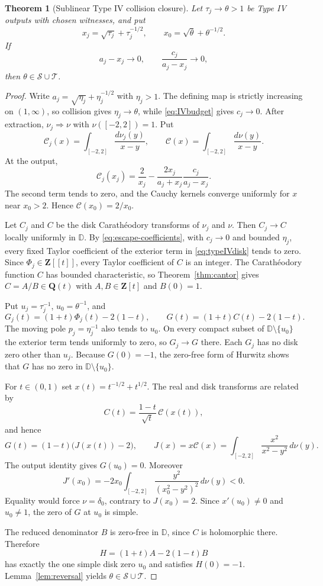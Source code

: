 \documentclass[11pt,reqno]{amsart}
\newtheorem{theorem}{Theorem}[section]
\theoremstyle{definition}
\theoremstyle{remark}
\newcommand{\D}{\mathbb D}
\newcommand{\Q}{\mathbf Q}
\newcommand{\Z}{\mathbf Z}
\newcommand{\calS}{\mathcal S}
\newcommand{\calT}{\mathcal T}
\begin{document}
\begin{theorem}[Sublinear Type IV collision closure]
\label{thm:IVsublinear}
Let $\tau_j\to\theta>1$ be Type IV outputs with chosen witnesses, and put
\[
 x_j=\sqrt{\tau_j}+\tau_j^{-1/2},\qquad
 x_0=\sqrt\theta+\theta^{-1/2}.
\]
If
\begin{equation}\label{eq:IVsublinear}
 a_j-x_j\longrightarrow0,
 \qquad \frac{c_j}{a_j-x_j}\longrightarrow0,
\end{equation}
then $\theta\in\calS\cup\calT$.
\end{theorem}

\begin{proof}
Write $a_j=\sqrt{\eta_j}+\eta_j^{-1/2}$ with $\eta_j>1$.  The defining
map is strictly increasing on $(1,\infty)$, so collision gives
$\eta_j\to\theta$, while \eqref{eq:IVbudget} gives $c_j\to0$.  After
extraction, $\nu_j\Rightarrow\nu$ with $\nu([-2,2])=1$.  Put
\[
 \mathcal C_j(x)=\int_{[-2,2]}\frac{d\nu_j(y)}{x-y},
 \qquad
 \mathcal C(x)=\int_{[-2,2]}\frac{d\nu(y)}{x-y}.
\]
At the output,
\[
 \mathcal C_j(x_j)=\frac2{x_j}
 -\frac{2x_j}{a_j+x_j}\frac{c_j}{a_j-x_j}.
\]
The second term tends to zero, and the Cauchy kernels converge uniformly for
$x$ near $x_0>2$.  Hence $\mathcal C(x_0)=2/x_0$.

Let $C_j$ and $C$ be the disk Carath\'eodory transforms of $\nu_j$ and
$\nu$.  Then $C_j\to C$ locally uniformly in $\D$.  By
\eqref{eq:escape-coefficients}, with $c_j\to0$ and bounded $\eta_j$, every
fixed Taylor coefficient of the exterior term in \eqref{eq:typeIVdisk}
tends to zero.  Since $\Phi_j\in\Z[[t]]$, every Taylor coefficient of $C$
is an integer.  The Carath\'eodory function $C$ has bounded characteristic,
so Theorem~\ref{thm:cantor} gives
$C=A/B\in\Q(t)$ with $A,B\in\Z[t]$ and $B(0)=1$.

Put $u_j=\tau_j^{-1}$, $u_0=\theta^{-1}$, and
\[
 G_j(t)=(1+t)\Phi_j(t)-2(1-t),\qquad
 G(t)=(1+t)C(t)-2(1-t).
\]
The moving pole $p_j=\eta_j^{-1}$ also tends to $u_0$.  On every compact
subset of $\D\setminus\{u_0\}$ the exterior term tends uniformly to zero,
so $G_j\to G$ there.  Each $G_j$ has no disk zero other than $u_j$.
Because $G(0)=-1$, the zero-free form of Hurwitz shows that $G$ has no zero
in $\D\setminus\{u_0\}$.

For $t\in(0,1)$ set $x(t)=t^{-1/2}+t^{1/2}$.  The real and disk transforms
are related by
\[
 C(t)=\frac{1-t}{\sqrt t}\,\mathcal C(x(t)),
\]
and hence
\[
 G(t)=(1-t)\bigl(J(x(t))-2\bigr),\qquad
 J(x)=x\mathcal C(x)
 =\int_{[-2,2]}\frac{x^2}{x^2-y^2}\,d\nu(y).
\]
The output identity gives $G(u_0)=0$.  Moreover
\[
 J'(x_0)=-2x_0\int_{[-2,2]}
 \frac{y^2}{(x_0^2-y^2)^2}\,d\nu(y)<0.
\]
Equality would force $\nu=\delta_0$, contrary to $J(x_0)=2$.  Since
$x'(u_0)\ne0$ and $u_0\ne1$, the zero of $G$ at $u_0$ is simple.

The reduced denominator $B$ is zero-free in $\D$, since $C$ is holomorphic
there.  Therefore
\[
 H=(1+t)A-2(1-t)B
\]
has exactly the one simple disk zero $u_0$ and satisfies $H(0)=-1$.
Lemma~\ref{lem:reversal} yields $\theta\in\calS\cup\calT$.
\end{proof}
\end{document}
